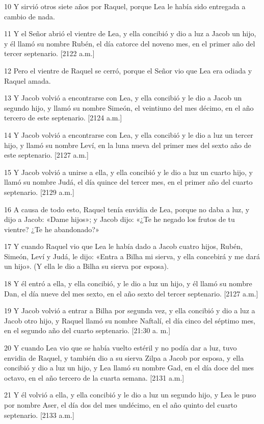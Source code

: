 \par 10 Y sirvió otros siete años por Raquel, porque Lea le había sido entregada a cambio de nada.
\par 11 Y el Señor abrió el vientre de Lea, y ella concibió y dio a luz a Jacob un hijo, y él llamó su nombre Rubén, el día catorce del noveno mes, en el primer año del tercer septenario. [2122 a.m.]
\par 12 Pero el vientre de Raquel se cerró, porque el Señor vio que Lea era odiada y Raquel amada.
\par 13 Y Jacob volvió a encontrarse con Lea, y ella concibió y le dio a Jacob un segundo hijo, y llamó su nombre Simeón, el veintiuno del mes décimo, en el año tercero de este septenario. [2124 a.m.]
\par 14 Y Jacob volvió a encontrarse con Lea, y ella concibió y le dio a luz un tercer hijo, y llamó su nombre Leví, en la luna nueva del primer mes del sexto año de este septenario. [2127 a.m.]
\par 15 Y Jacob volvió a unirse a ella, y ella concibió y le dio a luz un cuarto hijo, y llamó su nombre Judá, el día quince del tercer mes, en el primer año del cuarto septenario. [2129 a.m.]
\par 16 A causa de todo esto, Raquel tenía envidia de Lea, porque no daba a luz, y dijo a Jacob: «Dame hijos»; y Jacob dijo: «¿Te he negado los frutos de tu vientre? ¿Te he abandonado?»
\par 17 Y cuando Raquel vio que Lea le había dado a Jacob cuatro hijos, Rubén, Simeón, Leví y Judá, le dijo: «Entra a Bilha mi sierva, y ella concebirá y me dará un hijo». (Y ella le dio a Bilha su sierva por esposa).
\par 18 Y él entró a ella, y ella concibió, y le dio a luz un hijo, y él llamó su nombre Dan, el día nueve del mes sexto, en el año sexto del tercer septenario. [2127 a.m.]
\par 19 Y Jacob volvió a entrar a Bilha por segunda vez, y ella concibió y dio a luz a Jacob otro hijo, y Raquel llamó su nombre Naftalí, el día cinco del séptimo mes, en el segundo año del cuarto septenario. [21:30 a. m.]
\par 20 Y cuando Lea vio que se había vuelto estéril y no podía dar a luz, tuvo envidia de Raquel, y también dio a su sierva Zilpa a Jacob por esposa, y ella concibió y dio a luz un hijo, y Lea llamó su nombre Gad, en el día doce del mes octavo, en el año tercero de la cuarta semana. [2131 a.m.]
\par 21 Y él volvió a ella, y ella concibió y le dio a luz un segundo hijo, y Lea le puso por nombre Aser, el día dos del mes undécimo, en el año quinto del cuarto septenario. [2133 a.m.]
